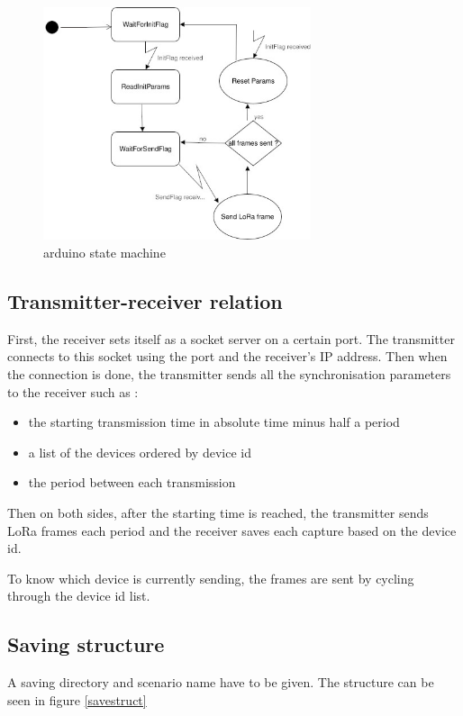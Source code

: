 \documentclass[a4paper, 12pt]{article}
\begin{document}
\begin{figure}
  \begin{center}
    \includegraphics[width=0.7\textwidth]{images/arduinoStateMachine.jpg}
  \end{center}
  \caption{arduino state machine}\label{ardSM}
\end{figure}


\subsection{Transmitter-receiver relation}
First, the receiver sets itself as a socket server on a certain port. The transmitter connects to this socket using the port and the receiver's IP address. Then when the connection is done, the transmitter sends all the synchronisation parameters to the receiver such as : 
\begin{itemize}
  \item the starting transmission time in absolute time minus half a period 
  \item a list of the devices ordered by device id
  \item the period between each transmission
\end{itemize}

Then on both sides, after the starting time is reached, the transmitter sends LoRa frames each period and the receiver saves each capture based on the device id.

To know which device is currently sending, the frames are sent by cycling through the device id list.

\subsection{Saving structure}
A saving directory and scenario name have to be given. 
The structure can be seen in figure \ref{savestruct}
\end{document}
